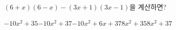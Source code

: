 $(6+x)(6-x)-(3x+1)(3x-1)$을 계산하면?
\begin{choicesii}{$-10x^2+35$}{$-10x^2+37$}{$-10x^2+6x+37$}{$8x^2+35$}{$8x^2+37$}\end{choicesii}
